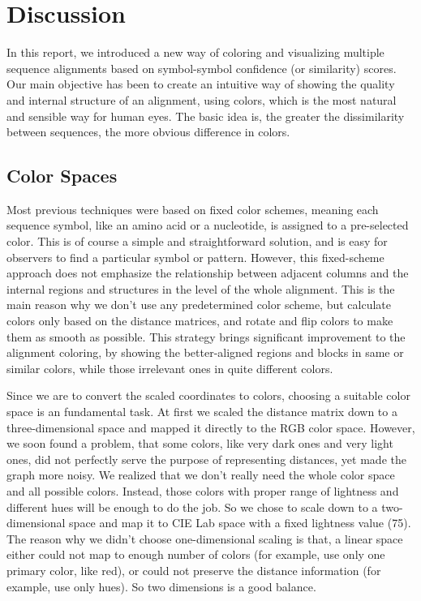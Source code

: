 \chapter{Discussion}\label{chap:Discussion}

In this report, we introduced a new way of coloring and visualizing multiple sequence alignments based on symbol-symbol confidence (or similarity) scores. Our main objective has been to create an intuitive way of showing the quality and internal structure of an alignment, using colors, which is the most natural and sensible way for human eyes. The basic idea is, the greater the dissimilarity between sequences, the more obvious difference in colors.

\section{Color Spaces}

Most previous techniques were based on fixed color schemes, meaning each sequence symbol, like an amino acid or a nucleotide, is assigned to a pre-selected color. This is of course a simple and straightforward solution, and is easy for observers to find a particular symbol or pattern. However, this fixed-scheme approach does not emphasize the relationship between adjacent columns and the internal regions and structures in the level of the whole alignment. This is the main reason why we don't use any predetermined color scheme, but calculate colors only based on the distance matrices, and rotate and flip colors to make them as smooth as possible. This strategy brings significant improvement to the alignment coloring, by showing the better-aligned regions and blocks in same or similar colors, while those irrelevant ones in quite different colors.

Since we are to convert the scaled coordinates to colors, choosing a suitable color space is an fundamental task. At first we scaled the distance matrix down to a three-dimensional space and mapped it directly to the RGB color space. However, we soon found a problem, that some colors, like very dark ones and very light ones, did not perfectly serve the purpose of representing distances, yet made the graph more noisy. We realized that we don't really need the whole color space and all possible colors. Instead, those colors with proper range of lightness and different hues will be enough to do the job. So we chose to scale down to a two-dimensional space and map it to CIE Lab space with a fixed lightness value (75). The reason why we didn’t choose one-dimensional scaling is that, a linear space either could not map to enough number of colors (for example, use only one primary color, like red), or could not preserve the distance information (for example, use only hues). So two dimensions is a good balance.

